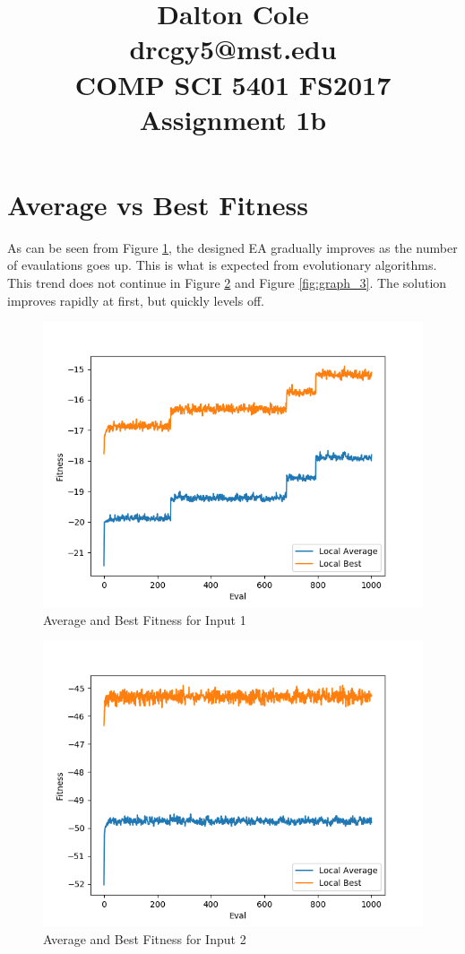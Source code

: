\documentclass[times]{article}
\begin{document}
	\title{Dalton Cole \\ drcgy5@mst.edu \\ COMP SCI 5401 FS2017 Assignment 1b}
	\date{}
	\maketitle

	\section{Average vs Best Fitness}
	As can be seen from Figure \ref{fig:graph_1}, the designed EA gradually improves as the number of evaulations goes up. This is what is expected from evolutionary algorithms. This trend does not continue in Figure \ref{fig:graph_2} and Figure \ref{fig:graph_3}. The solution improves rapidly at first, but quickly levels off.
	
	\begin{figure}
		\caption{Average and Best Fitness for Input 1}
		\label{fig:graph_1}
		\includegraphics[width=\textwidth]{../graphs/1.png}
	\end{figure}

	\begin{figure}
		\caption{Average and Best Fitness for Input 2}
		\label{fig:graph_2}
		\includegraphics[width=\textwidth]{../graphs/2.png}
	\end{figure}
\end{document}
